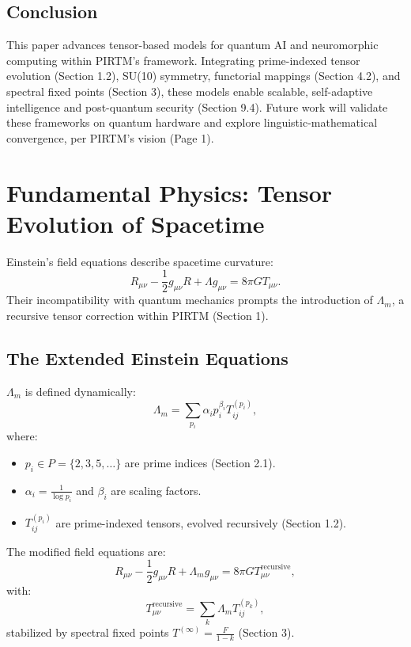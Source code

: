\documentclass{article}
\theoremstyle{plain}
\begin{document}
\subsection{Conclusion}
This paper advances tensor-based models for quantum AI and neuromorphic computing within PIRTM’s framework. Integrating prime-indexed tensor evolution (Section 1.2), SU(10) symmetry, functorial mappings (Section 4.2), and spectral fixed points (Section 3), these models enable scalable, self-adaptive intelligence and post-quantum security (Section 9.4). Future work will validate these frameworks on quantum hardware and explore linguistic-mathematical convergence, per PIRTM’s vision (Page 1).

\section{Fundamental Physics: Tensor Evolution of Spacetime}
Einstein’s field equations describe spacetime curvature:
\begin{equation}
R_{\mu\nu} - \frac{1}{2} g_{\mu\nu} R + \Lambda g_{\mu\nu} = 8\pi G T_{\mu\nu}.
\end{equation}
Their incompatibility with quantum mechanics prompts the introduction of \(\Lambda_m\), a recursive tensor correction within PIRTM (Section 1).

\subsection{The Extended Einstein Equations}
\(\Lambda_m\) is defined dynamically:
\begin{equation}
\Lambda_m = \sum_{p_i} \alpha_i p_i^{\beta_i} T_{ij}^{(p_i)},
\end{equation}
where:
\begin{itemize}
    \item \( p_i \in P = \{2, 3, 5, \dots\} \) are prime indices (Section 2.1).
    \item \( \alpha_i = \frac{1}{\log p_i} \) and \( \beta_i \) are scaling factors.
    \item \( T_{ij}^{(p_i)} \) are prime-indexed tensors, evolved recursively (Section 1.2).
\end{itemize}
The modified field equations are:
\begin{equation}
R_{\mu\nu} - \frac{1}{2} g_{\mu\nu} R + \Lambda_m g_{\mu\nu} = 8\pi G T_{\mu\nu}^{\text{recursive}},
\end{equation}
with:
\begin{equation}
T_{\mu\nu}^{\text{recursive}} = \sum_{k} \Lambda_m T_{ij}^{(p_k)},
\end{equation}
stabilized by spectral fixed points \( T^{(\infty)} = \frac{F}{1 - k} \) (Section 3).
\end{document}
